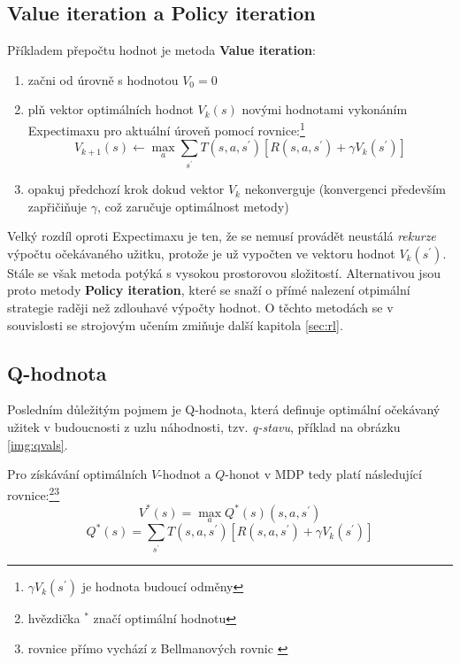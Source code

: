 \subsection{Value iteration a Policy iteration}
Příkladem přepočtu hodnot je metoda \textbf{Value iteration}\cite{RLAprox}:
\begin{enumerate}
\item začni od úrovně s hodnotou $V_{0} = 0$
\item plň vektor optimálních hodnot $V_{k}(s)$ novými hodnotami vykonáním Expectimaxu pro aktuální úroveň pomocí rovnice:\footnote{$\gamma V_k(s^\prime)$ je hodnota budoucí odměny}
\begin{displaymath}
V_{k+1}(s) \leftarrow \max_a \sum_{s^\prime}T(s,a,s^\prime) \left[R(s,a,s^\prime)+\gamma V_k(s^\prime) \right]
\end{displaymath}
\item opakuj předchozí krok dokud vektor $V_k$ nekonverguje (konvergenci především zapřičiňuje $\gamma$, což zaručuje optimálnost metody)
\end{enumerate}
Velký rozdíl oproti Expectimaxu je ten, že se nemusí provádět neustálá \textit{rekurze} výpočtu očekávaného užitku, protože je už vypočten ve vektoru hodnot $V_k(s^\prime)$. Stále se však metoda potýká s vysokou prostorovou složitostí. Alternativou jsou proto metody \textbf{Policy iteration}, které se snaží o přímé nalezení otpimální strategie raději než zdlouhavé výpočty hodnot. O těchto metodách se v souvislosti se strojovým učením zmiňuje další kapitola \ref{sec:rl}.

\subsection{Q-hodnota}
Posledním důležitým pojmem je Q-hodnota, která definuje optimální očekávaný užitek v budoucnosti z uzlu náhodnosti, tzv. \textit{q-stavu}, příklad na obrázku \ref{img:qvals}.

Pro získávání optimálních $V$-hodnot a $Q$-honot  v MDP tedy platí následující rovnice:\footnote{hvězdička $^{*}$ značí optimální hodnotu}\footnote{rovnice přímo vychází z Bellmanových rovnic \cite{mas}}
\begin{displaymath}
V^*(s) = \max_a Q^*(s) (s,a,s^\prime)
\end{displaymath}
\begin{displaymath}
Q^*(s) = \sum_{s^\prime}T(s,a,s^\prime) \left[R(s,a,s^\prime)+\gamma V_k(s^\prime) \right]
\end{displaymath}

